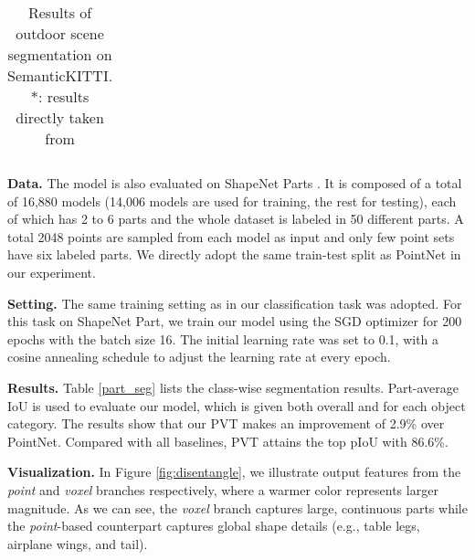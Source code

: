 \documentclass[10pt,twocolumn,letterpaper]{article}
\begin{document}
\begin{table*}[tb]
\begin{center}
{\begin{tabular}{|l|ccccccccccccccccccccc|}
\hline
\end{tabular} 
}
\end{center}  
\caption{Results of outdoor scene segmentation on SemanticKITTI. $*$: results directly taken from \cite{tang2020searching}}  
\label{KITTI}
\end{table*} 
\textbf{Data. }The model is also evaluated on ShapeNet Parts \cite{shapenet}. It is composed of a total of 16,880 models (14,006 models are used for training, the rest for testing), each of which has 2 to 6 parts and the whole dataset is labeled in 50 different parts. A total 2048 points are sampled from each model as input and only few point sets have six labeled parts. We directly adopt the same train-test split as PointNet in our experiment.

\textbf{Setting. } 
The same training setting as in our classification task was adopted. For this task on ShapeNet Part, we train our model using the SGD optimizer for 200 epochs with the batch size 16. The initial learning rate was set to 0.1, with a cosine annealing schedule to adjust the learning rate at every epoch.

\textbf{Results.} Table \ref{part_seg} lists the class-wise segmentation results. Part-average IoU is used to evaluate our model, which is given both overall and for each object category. The results show that our PVT makes an improvement of 2.9\% over PointNet. Compared with all baselines, PVT attains the top pIoU with 86.6\%. 

\textbf{Visualization.}  In Figure \ref{fig:disentangle}, we illustrate output features from the \emph{point} and \emph{voxel} branches respectively, where a warmer color represents larger magnitude. As we can see, the \emph{voxel} branch captures large, continuous parts while the \emph{point}-based counterpart captures global shape details (e.g., table legs, airplane wings, and tail).
\end{document}
